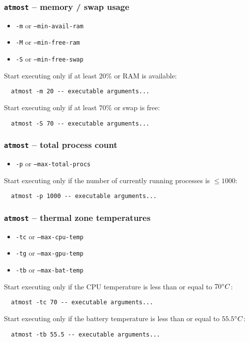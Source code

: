 \documentclass[compress,table,xcolor=table]{beamer}
\newcommand{\shelltext}[1]{\texttt{\colorbox{light-gray}{#1}}}
\begin{document}
\begin{frame}[fragile]
  \frametitle{\shelltext{atmost} -- memory / swap usage}
  \begin{itemize}
    \item \shelltext{-m} or \shelltext{--min-avail-ram}
    \item \shelltext{-M} or \shelltext{--min-free-ram}
    \item \shelltext{-S} or \shelltext{--min-free-swap}
  \end{itemize}

  \large
  Start executing only if at least $20\%$ or RAM is available:
  \normalsize
  \begin{verbatim}
  atmost -m 20 -- executable arguments...
  \end{verbatim}

  \large
  Start executing only if at least $70\%$ or swap is free:
  \normalsize
  \begin{verbatim}
  atmost -S 70 -- executable arguments...
  \end{verbatim}
\end{frame}
\begin{frame}[fragile]
  \frametitle{\shelltext{atmost} -- total process count}
  \begin{itemize}
    \item \shelltext{-p} or \shelltext{--max-total-procs}
  \end{itemize}

  \large
  Start executing only if the number of currently running processes is $\leq 1000$:
  \normalsize
  \begin{verbatim}
  atmost -p 1000 -- executable arguments...
  \end{verbatim}
\end{frame}
\begin{frame}[fragile]
  \frametitle{\shelltext{atmost} -- thermal zone temperatures}
  \begin{itemize}
    \item \shelltext{-tc} or \shelltext{--max-cpu-temp}
    \item \shelltext{-tg} or \shelltext{--max-gpu-temp}
    \item \shelltext{-tb} or \shelltext{--max-bat-temp}
  \end{itemize}

  \large
  Start executing only if the CPU temperature is less than or equal
  to $70\degree C$:
  \normalsize
  \begin{verbatim}
  atmost -tc 70 -- executable arguments...
  \end{verbatim}

  \large
  Start executing only if the battery temperature is less than or equal
  to $55.5\degree C$:
  \normalsize
  \begin{verbatim}
  atmost -tb 55.5 -- executable arguments...
  \end{verbatim}
\end{frame}
\end{document}

